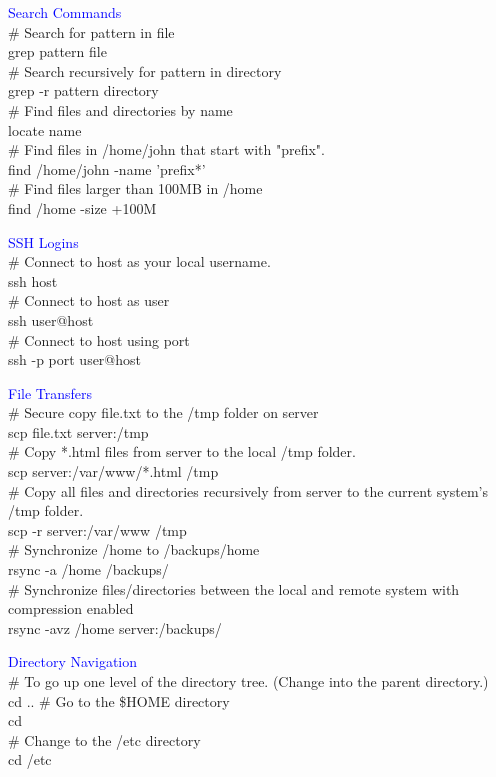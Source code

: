 \documentclass{article}
\begin{document}
\textcolor{blue}{Search Commands}\\
\noindent
\# Search for pattern in file\\
grep pattern file\\
\# Search recursively for pattern in directory\\
grep -r pattern directory\\
\# Find files and directories by name\\
locate name\\
\# Find files in /home/john that start with "prefix".\\
find /home/john -name 'prefix*'\\
\# Find files larger than 100MB in /home\\
find /home -size +100M\\

\textcolor{blue}{SSH Logins}\\
\noindent
\# Connect to host as your local username.\\
ssh host\\
\# Connect to host as user\\
ssh user@host\\
\# Connect to host using port\\
ssh -p port user@host\\

\textcolor{blue}{File Transfers}\\
\noindent
\# Secure copy file.txt to the /tmp folder on server\\
scp file.txt server:/tmp\\
\# Copy *.html files from server to the local /tmp folder.\\
scp server:/var/www/*.html /tmp\\
\# Copy all files and directories recursively from server to the current system's /tmp folder.\\
scp -r server:/var/www /tmp\\
\# Synchronize /home to /backups/home\\
rsync -a /home /backups/\\
\# Synchronize files/directories between the local and remote system with compression enabled\\
rsync -avz /home server:/backups/\\

\textcolor{blue}{Directory Navigation}\\
\noindent
\# To go up one level of the directory tree.  (Change into the parent directory.)\\
cd ..
\# Go to the \$HOME directory\\
cd\\
\# Change to the /etc directory\\
cd /etc\\
\end{document}
